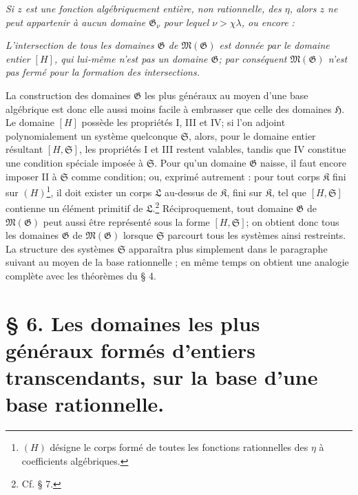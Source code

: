 \emph{Si $z$ est une fonction algébriquement entière, non rationnelle, des $\eta$, alors $z$ ne peut appartenir à aucun domaine $\mathfrak G_\nu$ pour lequel $\nu>\chi\lambda$, ou encore :}

\emph{L'intersection de tous les domaines $\mathfrak G$ de $\mathfrak M(\mathfrak G)$ est donnée par le domaine entier $[H]$, qui lui-même n'est pas un domaine $\mathfrak G$; par conséquent $\mathfrak M(\mathfrak G)$ n'est pas fermé pour la formation des intersections.}

La construction des domaines $\mathfrak G$ les plus généraux au moyen d'une base algébrique est donc elle aussi moins facile à embrasser que celle des domaines $\mathfrak H$. Le domaine $[H]$ possède les propriétés I, III et IV; si l'on adjoint polynomialement un système quelconque $\mathfrak S$, alors, pour le domaine entier résultant $[H,\mathfrak S]$, les propriétés I et III restent valables, tandis que IV constitue une condition spéciale imposée à $\mathfrak S$. Pour qu'un domaine $\mathfrak G$ naisse, il faut encore imposer II à $\mathfrak S$ comme condition; ou, exprimé autrement : pour tout corps $\mathfrak K$ fini sur $(H)$\footnote{$(H)$ désigne le corps formé de toutes les fonctions rationnelles des $\eta$ à coefficients algébriques.}, il doit exister un corps $\mathfrak L$ au-dessus de $\mathfrak K$, fini sur $\mathfrak K$, tel que $[H,\mathfrak S]$ contienne un élément primitif de $\mathfrak L$.\footnote{Cf. \S{} 7.} Réciproquement, tout domaine $\mathfrak G$ de $\mathfrak M(\mathfrak G)$ peut aussi être représenté sous la forme $[H,\mathfrak S]$; on obtient donc tous les domaines $\mathfrak G$ de $\mathfrak M(\mathfrak G)$ lorsque $\mathfrak S$ parcourt tous les systèmes ainsi restreints. La structure des systèmes $\mathfrak S$ apparaîtra plus simplement dans le paragraphe suivant au moyen de la \og{} base rationnelle \fg{}; en même temps on obtient une analogie complète avec les théorèmes du \S{} 4.

\section*{\S{} 6. Les domaines les plus généraux formés d'entiers transcendants, sur la base d'une base rationnelle.}

